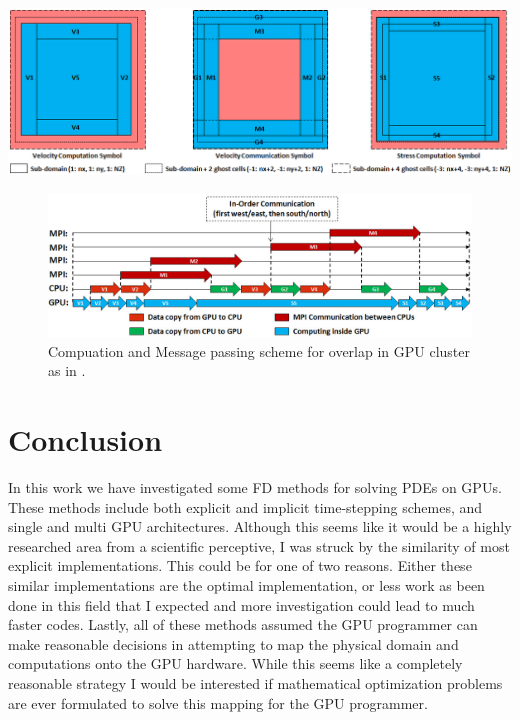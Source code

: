 \documentclass[conference]{IEEEtran}
\begin{document}
\includegraphics[scale=.25]{passing.png}
\begin{figure}[h]
\caption{Compuation and Message passing scheme for overlap in GPU cluster as in \cite{Zhou}.}
\includegraphics[scale=.25]{passing2.png}
\end{figure}

\section{Conclusion}
In this work we have investigated some FD methods for solving PDEs on GPUs. These methods include both explicit and implicit time-stepping schemes, and single and multi GPU architectures. Although this seems like it would be a highly researched area from a scientific perceptive, I was struck by the similarity of most explicit implementations. This could be for one of two reasons. Either these similar implementations are the optimal implementation, or less work as been done in this field that I expected and more investigation could lead to much faster codes. Lastly, all of these methods assumed the GPU programmer can make reasonable decisions in attempting to map the physical domain and computations onto the GPU hardware. While this seems like a completely reasonable strategy I would be interested if mathematical optimization problems are ever formulated to solve this mapping for the GPU programmer.
\end{document}
